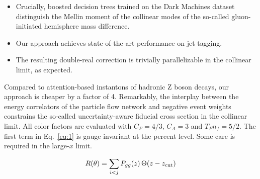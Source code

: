 \begin{itemize}
  \item Crucially, boosted decision trees trained on the Dark Machines dataset distinguish the Mellin moment of the collinear modes of the so-called gluon-initiated hemisphere mass difference.
  \item Our approach achieves state-of-the-art performance on jet tagging.
  \item The resulting double-real correction is trivially parallelizable in the collinear limit, as expected.
\end{itemize}

Compared to attention-based instantons of hadronic Z boson decays, our
approach is cheaper by a factor of 4. Remarkably, the interplay between
the energy correlators of the particle flow network and negative event
weights constrains the so-called uncertainty-aware fiducial cross
section in the collinear limit. All color factors are evaluated with
$C_F = 4/3$, $C_A = 3$ and $T_F n_f = 5/2$. The first term in
Eq.~\eqref{eq:1} is gauge invariant at the percent level. Some care is
required in the large-$x$ limit.

\begin{equation}
  R(\theta) = \sum_{i<j} P_{gg}(z) \, \Theta(z - z_{\rm cut})
  \label{eq:4}
\end{equation}

